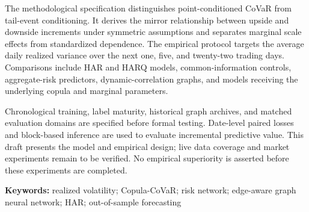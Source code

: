 \documentclass[UTF8,zihao=-4,oneside,openany,fontset=fandol]{ctexbook}
\numberwithin{equation}{chapter}
\begin{document}
The methodological specification distinguishes point-conditioned CoVaR from tail-event conditioning. It derives the mirror relationship between upside and downside increments under symmetric assumptions and separates marginal scale effects from standardized dependence. The empirical protocol targets the average daily realized variance over the next one, five, and twenty-two trading days. Comparisons include HAR and HARQ models, common-information controls, aggregate-risk predictors, dynamic-correlation graphs, and models receiving the underlying copula and marginal parameters.

Chronological training, label maturity, historical graph archives, and matched evaluation domains are specified before formal testing. Date-level paired losses and block-based inference are used to evaluate incremental predictive value. This draft presents the model and empirical design; live data coverage and market experiments remain to be verified. No empirical superiority is asserted before these experiments are completed.

\noindent\textbf{Keywords:} realized volatility; Copula-CoVaR; risk network; edge-aware graph neural network; HAR; out-of-sample forecasting

\tableofcontents
\end{document}
